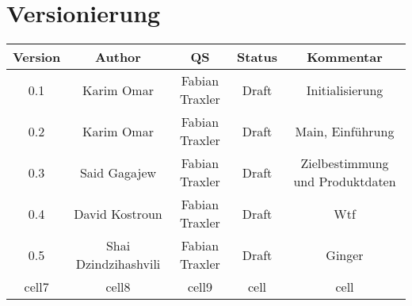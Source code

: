 
\section{Versionierung}
\begin{center}
\begin{tabular}{ |c|c|c|c|c| } 
 \hline
 \textbf{Version} & \textbf{Author} & \textbf{QS} & \textbf{Status} & \textbf{Kommentar} \\ 
 \hline
 0.1 & Karim Omar & Fabian Traxler & Draft & Initialisierung \\ 
 \hline
 0.2 & Karim Omar & Fabian Traxler & Draft & Main, Einführung \\
 \hline
 0.3 & Said Gagajew & Fabian Traxler & Draft & Zielbestimmung und Produktdaten \\
 \hline
 0.4 & David Kostroun & Fabian Traxler & Draft & Wtf \\
 \hline
 0.5 & Shai Dzindzihashvili & Fabian Traxler & Draft & Ginger \\
 \hline
 cell7 & cell8 & cell9 & cell & cell \\ 
 \hline
\end{tabular}
\end{center}

